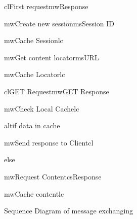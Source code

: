 \begin{figure}[h]
\begin{center}

	\resizebox{1.0\textwidth}{0.8\textwidth} {

	\begin{sequencediagram}

	\begin{call}{cl}{First request}{mw}{Response}

		\begin{call}{mw}{Create new session}{ms}{Session ID}
		\end{call}

		\begin{call}{mw}{Cache Session}{lc}{}
		\end{call}

		\begin{call}{mw}{Get content locator}{ms}{URL}
		\end{call}

		\begin{call}{mw}{Cache Locator}{lc}{}
		\end{call}

	\end{call}

	\begin{call}{cl}{GET Request}{mw}{GET Response}
		
		\begin{call}{mw}{Check Local Cache}{lc}{}
		\end{call}

		\begin{sdblock}{alt}{if data in cache}
			\begin{call}{mw}{Send response to Client}{cl}{}
			\end{call}
			\begin{sdblock}{else}{}
				\begin{call}{mw}{Request Content}{cs}{Response}
				\end{call}
				\begin{call}{mw}{Cache content}{lc}{}
				\end{call}
			\end{sdblock}
		\end{sdblock}


	\end{call}

	\end{sequencediagram}
	}

\end{center}
\caption{Sequence Diagram of message exchanging}
\label{fig:arch_uml}
\end{figure}

\newpage
